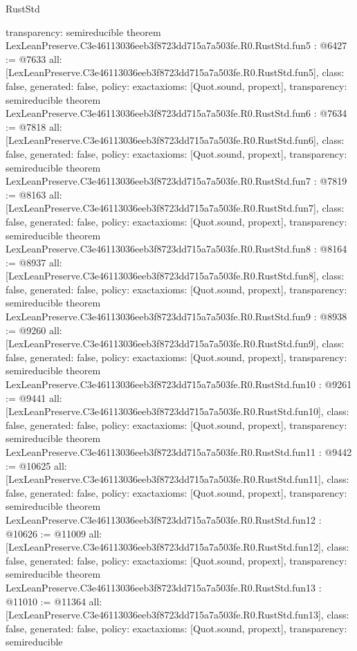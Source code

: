 \begin{lexlean}{RustStd}
\begin{coremodule}
{  transparency: semireducible
}
theorem LexLeanPreserve.C3e46113036eeb3f8723dd715a7a503fe.R0.RustStd.fun5 : @6427 := @7633 {
  all: [LexLeanPreserve.C3e46113036eeb3f8723dd715a7a503fe.R0.RustStd.fun5],
  class: false,
  generated: false,
  policy: exact{axioms: [Quot.sound, propext]},
  transparency: semireducible
}
theorem LexLeanPreserve.C3e46113036eeb3f8723dd715a7a503fe.R0.RustStd.fun6 : @7634 := @7818 {
  all: [LexLeanPreserve.C3e46113036eeb3f8723dd715a7a503fe.R0.RustStd.fun6],
  class: false,
  generated: false,
  policy: exact{axioms: [Quot.sound, propext]},
  transparency: semireducible
}
theorem LexLeanPreserve.C3e46113036eeb3f8723dd715a7a503fe.R0.RustStd.fun7 : @7819 := @8163 {
  all: [LexLeanPreserve.C3e46113036eeb3f8723dd715a7a503fe.R0.RustStd.fun7],
  class: false,
  generated: false,
  policy: exact{axioms: [Quot.sound, propext]},
  transparency: semireducible
}
theorem LexLeanPreserve.C3e46113036eeb3f8723dd715a7a503fe.R0.RustStd.fun8 : @8164 := @8937 {
  all: [LexLeanPreserve.C3e46113036eeb3f8723dd715a7a503fe.R0.RustStd.fun8],
  class: false,
  generated: false,
  policy: exact{axioms: [Quot.sound, propext]},
  transparency: semireducible
}
theorem LexLeanPreserve.C3e46113036eeb3f8723dd715a7a503fe.R0.RustStd.fun9 : @8938 := @9260 {
  all: [LexLeanPreserve.C3e46113036eeb3f8723dd715a7a503fe.R0.RustStd.fun9],
  class: false,
  generated: false,
  policy: exact{axioms: [Quot.sound, propext]},
  transparency: semireducible
}
theorem LexLeanPreserve.C3e46113036eeb3f8723dd715a7a503fe.R0.RustStd.fun10 : @9261 := @9441 {
  all: [LexLeanPreserve.C3e46113036eeb3f8723dd715a7a503fe.R0.RustStd.fun10],
  class: false,
  generated: false,
  policy: exact{axioms: [Quot.sound, propext]},
  transparency: semireducible
}
theorem LexLeanPreserve.C3e46113036eeb3f8723dd715a7a503fe.R0.RustStd.fun11 : @9442 := @10625 {
  all: [LexLeanPreserve.C3e46113036eeb3f8723dd715a7a503fe.R0.RustStd.fun11],
  class: false,
  generated: false,
  policy: exact{axioms: [Quot.sound, propext]},
  transparency: semireducible
}
theorem LexLeanPreserve.C3e46113036eeb3f8723dd715a7a503fe.R0.RustStd.fun12 : @10626 := @11009 {
  all: [LexLeanPreserve.C3e46113036eeb3f8723dd715a7a503fe.R0.RustStd.fun12],
  class: false,
  generated: false,
  policy: exact{axioms: [Quot.sound, propext]},
  transparency: semireducible
}
theorem LexLeanPreserve.C3e46113036eeb3f8723dd715a7a503fe.R0.RustStd.fun13 : @11010 := @11364 {
  all: [LexLeanPreserve.C3e46113036eeb3f8723dd715a7a503fe.R0.RustStd.fun13],
  class: false,
  generated: false,
  policy: exact{axioms: [Quot.sound, propext]},
  transparency: semireducible
}
\end{coremodule}
\end{lexlean}
